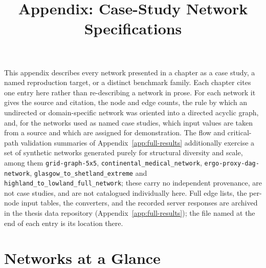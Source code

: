 \documentclass[12pt]{report}
\providecommand{\filepath}[1]{\nolinkurl{#1}}
\begin{document}
\title{Appendix: Case-Study Network Specifications}
\fi

This appendix describes every network presented in a chapter as a case study, a named
reproduction target, or a distinct benchmark family. Each chapter cites one entry here
rather than re-describing a network in prose. For each network it gives the source and
citation, the node and edge counts, the rule by which an undirected or domain-specific
network was oriented into a directed acyclic graph, and, for the networks used as named
case studies, which input values are taken from a source and which are assigned for
demonstration. The flow and critical-path validation summaries of
Appendix~\ref{app:full-results} additionally exercise a set of synthetic networks
generated purely for structural diversity and scale, among them
\filepath{grid-graph-5x5}, \filepath{continental\_medical\_network},
\texttt{ergo-proxy-dag-network}, \filepath{glasgow\_to\_shetland\_extreme} and
\filepath{highland\_to\_lowland\_full\_network}; these carry no independent provenance,
are not case studies, and are not catalogued individually here. Full edge lists, the
per-node input tables, the converters, and the recorded server responses are archived in
the thesis data repository (Appendix~\ref{app:full-results}); the file named at the end of
each entry is its location there.

\section{Networks at a Glance}
\label{sec:appA-glance}
\end{document}
